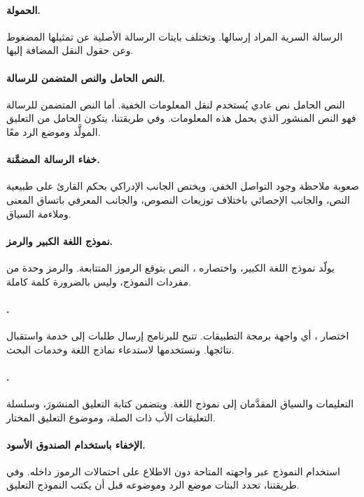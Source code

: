 \paragraph{الحمولة.}
الرسالة السرية المراد إرسالها. وتختلف بايتات الرسالة الأصلية عن تمثيلها المضغوط وعن حقول النقل المضافة إليها.

\paragraph{النص الحامل والنص المتضمن للرسالة.}
النص الحامل نص عادي يُستخدم لنقل المعلومات الخفية. أما النص المتضمن للرسالة فهو النص المنشور الذي يحمل هذه المعلومات. وفي طريقتنا، يتكون الحامل من التعليق المولَّد وموضع الرد معًا.

\paragraph{خفاء الرسالة المضمَّنة.}
صعوبة ملاحظة وجود التواصل الخفي. ويختص الجانب الإدراكي بحكم القارئ على طبيعية النص، والجانب الإحصائي باختلاف توزيعات النصوص، والجانب المعرفي باتساق المعنى وملاءمة السياق.

\paragraph{نموذج اللغة الكبير والرمز.}
يولّد نموذج اللغة الكبير، واختصاره ، النص بتوقع الرموز المتتابعة. والرمز وحدة من مفردات النموذج، وليس بالضرورة كلمة كاملة.

\paragraph{.}
اختصار ، أي واجهة برمجة التطبيقات. تتيح للبرنامج إرسال طلبات إلى خدمة واستقبال نتائجها. ونستخدمها لاستدعاء نماذج اللغة وخدمات البحث.

\paragraph{.}
التعليمات والسياق المقدَّمان إلى نموذج اللغة. ويتضمن  كتابة التعليق المنشورَ، وسلسلة التعليقات الأب ذات الصلة، وموضوع التعليق المختار.

\paragraph{الإخفاء باستخدام الصندوق الأسود.}
استخدام النموذج عبر واجهته المتاحة دون الاطلاع على احتمالات الرموز داخله. وفي طريقتنا، تحدد البتات موضع الرد وموضوعه قبل أن يكتب النموذج التعليق.

